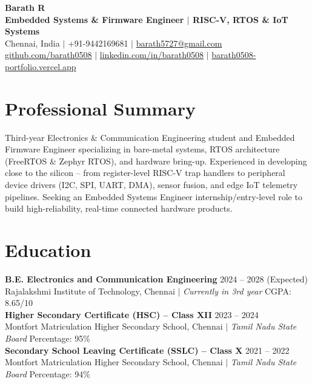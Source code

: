 \documentclass[a4paper,9pt]{extarticle}
\begin{document}
\fontsize{9pt}{10.8pt}\selectfont

\begin{center}
    {\Large \textbf{Barath R}} \\[1.5pt]
    \textbf{Embedded Systems \& Firmware Engineer $\vert$ RISC-V, RTOS \& IoT Systems} \\[1.5pt]
    Chennai, India $\vert$ +91-9442169681 $\vert$ \href{mailto:barath5727@gmail.com}{barath5727@gmail.com} \\
    \href{https://github.com/barath0508}{github.com/barath0508} $\vert$ \href{https://www.linkedin.com/in/barath0508/}{linkedin.com/in/barath0508} $\vert$ \href{https://barath0508-portfolio.vercel.app}{barath0508-portfolio.vercel.app}
\end{center}
\vspace{-3.5pt}

\section*{Professional Summary}
Third-year Electronics \& Communication Engineering student and Embedded Firmware Engineer specializing in bare-metal systems, RTOS architecture (FreeRTOS \& Zephyr RTOS), and hardware bring-up. Experienced in developing close to the silicon -- from register-level RISC-V trap handlers to peripheral device drivers (I2C, SPI, UART, DMA), sensor fusion, and edge IoT telemetry pipelines. Seeking an Embedded Systems Engineer internship/entry-level role to build high-reliability, real-time connected hardware products.

\section*{Education}
\textbf{B.E. Electronics and Communication Engineering} \hfill 2024 -- 2028 (Expected) \\
Rajalakshmi Institute of Technology, Chennai $\vert$ \textit{Currently in 3rd year} \hfill CGPA: 8.65/10
\\[1.5pt]
\textbf{Higher Secondary Certificate (HSC) -- Class XII} \hfill 2023 -- 2024 \\
Montfort Matriculation Higher Secondary School, Chennai $\vert$ \textit{Tamil Nadu State Board} \hfill Percentage: 95\%
\\[1.5pt]
\textbf{Secondary School Leaving Certificate (SSLC) -- Class X} \hfill 2021 -- 2022 \\
Montfort Matriculation Higher Secondary School, Chennai $\vert$ \textit{Tamil Nadu State Board} \hfill Percentage: 94\%
\end{document}
